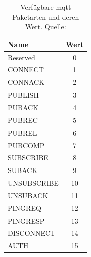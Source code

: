 \begin{table}[h!]
\centering
\renewcommand{\arraystretch}{1.5}
\begin{tabular}{|l|c|}
    \hline
    \textbf{Name} & \textbf{Wert} \\
    \hline
    \hline
    Reserved & 0 \\
    \hline
    CONNECT & 1 \\
    \hline
    CONNACK & 2 \\
    \hline
    PUBLISH & 3 \\
    \hline
    PUBACK & 4 \\
    \hline
    PUBREC & 5 \\
    \hline
    PUBREL & 6 \\
    \hline
    PUBCOMP & 7 \\
    \hline
    SUBSCRIBE & 8 \\
    \hline
    SUBACK & 9 \\
    \hline
    UNSUBSCRIBE & 10 \\
    \hline
    UNSUBACK & 11 \\
    \hline
    PINGREQ & 12 \\
    \hline
    PINGRESP & 13 \\
    \hline
    DISCONNECT & 14 \\
    \hline
    AUTH & 15 \\
    \hline
\end{tabular}
\caption{Verfügbare \ac{mqtt} Paketarten und deren Wert. Quelle: \cite{mqtt5Specification}}
\label{table:mqtt-packet-types}
\end{table}

